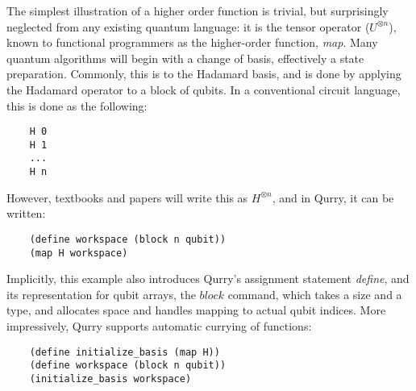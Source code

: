 \documentclass[journal]{article}
\begin{document}
    The simplest illustration of a higher order function is trivial, but surprisingly neglected from any existing quantum language: it is the tensor operator ($U^{\otimes n}$), known to functional programmers as the higher-order function, \emph{map}.
    Many quantum algorithms will begin with a change of basis, effectively a state preparation. 
    Commonly, this is to the Hadamard basis, and is done by applying the Hadamard operator to a block of qubits.
    In a conventional circuit language, this is done as the following:
    \begin{verbatim}
    H 0
    H 1
    ...
    H n\end{verbatim}
    However, textbooks and papers will write this as $H^{\otimes n}$, and in Qurry, it can be written:
    \begin{verbatim}
    (define workspace (block n qubit))
    (map H workspace)\end{verbatim}
    Implicitly, this example also introduces Qurry's assignment statement \emph{define}, and its representation for qubit arrays, the $block$ command, which takes a size and a type, and allocates space and handles mapping to actual qubit indices.
    More impressively, Qurry supports automatic currying of functions:
    \begin{verbatim}
    (define initialize_basis (map H))
    (define workspace (block n qubit))
    (initialize_basis workspace)\end{verbatim}
\end{document}
